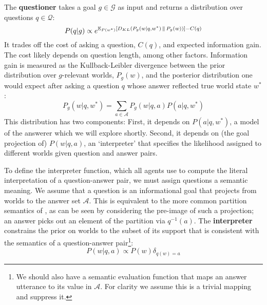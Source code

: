 \documentclass[10pt,letterpaper]{article}
\begin{document}
The \textbf{questioner} takes a goal $g \in \mathcal{G}$ as input and returns a distribution over questions $q \in \mathcal{Q}$:
%
$$ 
P(q|g) \propto e^{\mathbb{E}_{P(w^*)}\left [D_{KL}({P_g(w|q, w^*)}\, \| \, {P_g(w)}) \right] - C(q)} 
$$
%
It trades off the cost of asking a question, $C(q)$, and expected information gain. The cost likely depends on question length, among other factors. Information gain is measured as the Kullback-Leibler divergence between the prior distribution over $g$-relevant worlds, $P_g(w)$, and the posterior distribution one would expect after asking a question $q$ whose answer reflected true world state $w^*$:
%
$$ P_g(w|q, w^*) = \sum_{a \in \mathcal{A}} P_g(w |q, a) P(a| q, w^*)$$
%
This distribution has two components: 
First, it depends on $P(a | q, w^*)$, a model of the answerer which we will explore shortly.
Second, it depends on (the goal projection of) $P(w | q, a)$, an `interpreter' that specifies the likelihood assigned to different worlds given question and answer pairs.

To define the interpreter function, which all agents use to compute the literal interpretation of a question-answer pair, we must assign questions a semantic meaning.
We assume that a question is an informational goal that projects from worlds to the answer set $\mathcal{A}$.
This is equivalent to the more common partition semantics of , as can be seen by considering the pre-image of such a projection; an answer picks out an element of the partition via $q^{-1}(a)$.
The \textbf{interpreter} constrains the prior on worlds to the subset of its support that is consistent with the semantics of a question-answer pair\footnote{We should also have a semantic evaluation function that maps an answer utterance to its value in $\mathcal{A}$. For clarity we assume this is a trivial mapping and suppress it.}:
%
$$P(w | q, a) \propto P(w) \delta_{q(w)=a}$$
\end{document}
